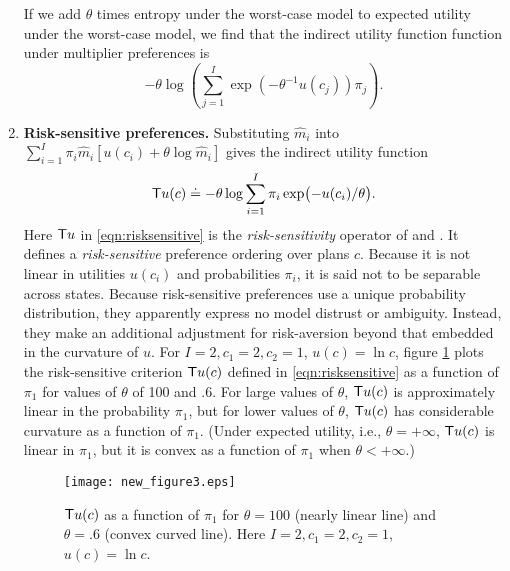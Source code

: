 \begin{enumerate}
\begin{remark} If we add $\theta $ times entropy under the worst-case model to expected utility under the worst-case model,
we find that the indirect utility function function under multiplier preferences is
\[  -  \theta \log \left(\sum_{j=1}^I \exp(- \theta^{-1} u(c_j) ) \pi_j \right) .\]

\end{remark}

\item\textbf{Risk-sensitive preferences.}
%
 Substituting $\hat m_i$ into $\sum_{i=1}^I \pi_i \hat m_i [  u(c_i) + \theta \log \hat m_i ]$  gives the indirect utility function
\begin{equation}\label{eqn:risksensitive} {\sf T} u(c) \doteq - \theta \log \sum_{i=1}^I \pi_i \exp\bigl(- u(c_i)/\theta  \bigr). \end{equation}
 Here  ${\sf T} u$  in \eqref{eqn:risksensitive} is  the \textit{risk-sensitivity} operator of \citet{jacobson} and \citet{whittle}.
 It  defines  a {\em risk-sensitive}  preference ordering over plans $c$.  Because it is not linear
in utilities $u(c_i)$ and probabilities $\pi_i$, it is said not to be separable across states.
Because risk-sensitive preferences use a unique probability distribution, they apparently  express no model distrust or ambiguity. Instead, they
make an additional adjustment for risk-aversion beyond that embedded in the curvature
of $u$.
For  $I=2, c_1=2, c_2=1$, $u(c) = \ln c$,  figure \ref{fig_new_figure3} plots the risk-sensitive criterion ${\sf T} u(c)$ defined in  \eqref{eqn:risksensitive}
 as a function of $\pi_1$  for values of $\theta$
 of 100 and .6. For large values of $\theta$,  ${\sf T} u(c)$ is approximately linear in the  probability $\pi_1$, but for lower values of $\theta$,
 ${\sf T} u(c)$ has considerable curvature as a function of $\pi_1$. (Under  expected utility, i.e.,
$\theta =+\infty $,  ${\sf T}u(c)$ is linear in $\pi_1$, but  it is convex as a function of $\pi_1$ when $\theta< + \infty$.)


\begin{figure}[htp]
\centering
\texttt{[image: new\_figure3.eps]}
\caption[${\sf T} u(c)$]{${\sf T} u(c)$ as a function of $\pi_1$ for $\theta=100$ (nearly linear line) and $\theta=.6$ (convex curved line). Here $I=2, c_1=2, c_2=1$, $u(c) = \ln c$.}\label{fig_new_figure3}
\end{figure}



\end{enumerate}

